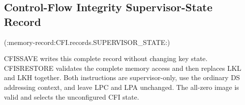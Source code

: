 \subsection{Control-Flow Integrity Supervisor-State Record}

(:memory-record:CFI.records.SUPERVISOR_STATE:)

CFISSAVE writes this complete record without changing key state. CFISRESTORE validates the complete memory access and then replaces LKL and LKH together. Both instructions are supervisor-only, use the ordinary DS addressing context, and leave LPC and LPA unchanged. The all-zero image is valid and selects the unconfigured CFI state.
